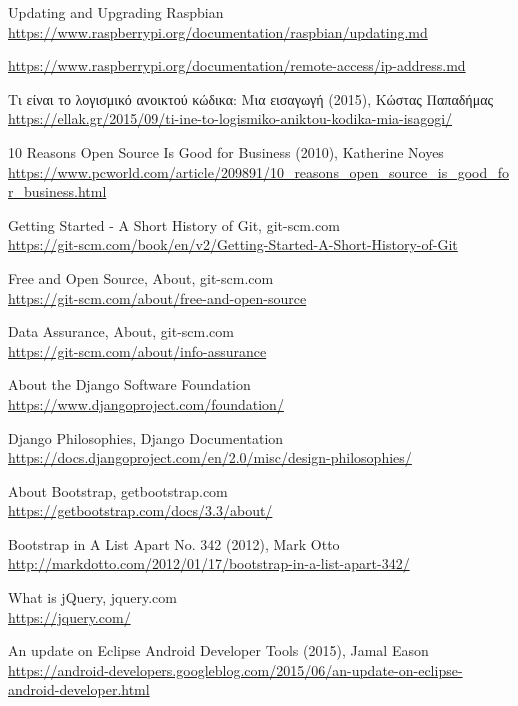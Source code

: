 \begin{thebibliography}{99}
Updating and Upgrading Raspbian
\url{https://www.raspberrypi.org/documentation/raspbian/updating.md}

\url{https://www.raspberrypi.org/documentation/remote-access/ip-address.md}

Τι είναι το λογισμικό ανοικτού κώδικα: Μια εισαγωγή (2015), Κώστας Παπαδήμας\\
\url{https://ellak.gr/2015/09/ti-ine-to-logismiko-aniktou-kodika-mia-isagogi/}

10 Reasons Open Source Is Good for Business (2010), Katherine Noyes\\
\url{https://www.pcworld.com/article/209891/10_reasons_open_source_is_good_for_business.html}

Getting Started - A Short History of Git, git-scm.com\\
\url{https://git-scm.com/book/en/v2/Getting-Started-A-Short-History-of-Git}

Free and Open Source, About, git-scm.com\\
\url{https://git-scm.com/about/free-and-open-source}

Data Assurance, About, git-scm.com\\
\url{https://git-scm.com/about/info-assurance}

About the Django Software Foundation\\
\url{https://www.djangoproject.com/foundation/}

Django Philosophies, Django Documentation\\
\url{https://docs.djangoproject.com/en/2.0/misc/design-philosophies/}

About Bootstrap, getbootstrap.com\\
\url{https://getbootstrap.com/docs/3.3/about/}

Bootstrap in A List Apart No. 342 (2012), Mark Otto\\
\url{http://markdotto.com/2012/01/17/bootstrap-in-a-list-apart-342/}

What is jQuery, jquery.com\\
\url{https://jquery.com/}

An update on Eclipse Android Developer Tools (2015), Jamal Eason\\
\url{https://android-developers.googleblog.com/2015/06/an-update-on-eclipse-android-developer.html}


\end{thebibliography}
